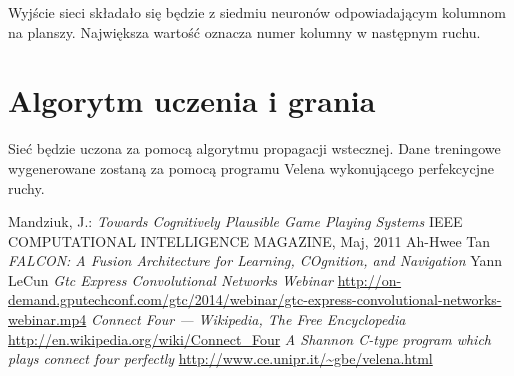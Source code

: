 \documentclass{llncs}
\begin{document}
Wyjście sieci składało się będzie z siedmiu neuronów odpowiadającym kolumnom na planszy. Największa wartość oznacza numer kolumny w następnym ruchu.

\section{Algorytm uczenia i grania}
Sieć będzie uczona za pomocą algorytmu propagacji wstecznej. Dane treningowe wygenerowane zostaną za pomocą programu Velena\cite{velena} wykonującego perfekcycjne ruchy.

%
%
\begin{thebibliography}{4}
%
Mandziuk, J.:
\textsl{Towards Cognitively Plausible Game Playing Systems}
IEEE COMPUTATIONAL INTELLIGENCE MAGAZINE, Maj, 2011
Ah-Hwee Tan
\textsl{FALCON: A Fusion Architecture for Learning, COgnition, and Navigation}
Yann LeCun
\textsl{Gtc Express Convolutional Networks Webinar}
\url{http://on-demand.gputechconf.com/gtc/2014/webinar/gtc-express-convolutional-networks-webinar.mp4}
\textsl{Connect Four --- {W}ikipedia{,} The Free Encyclopedia}
\url{http://en.wikipedia.org/wiki/Connect_Four}
\textsl{A Shannon C-type program which plays connect four perfectly}
\url{http://www.ce.unipr.it/~gbe/velena.html}
\end{thebibliography}
\end{document}
